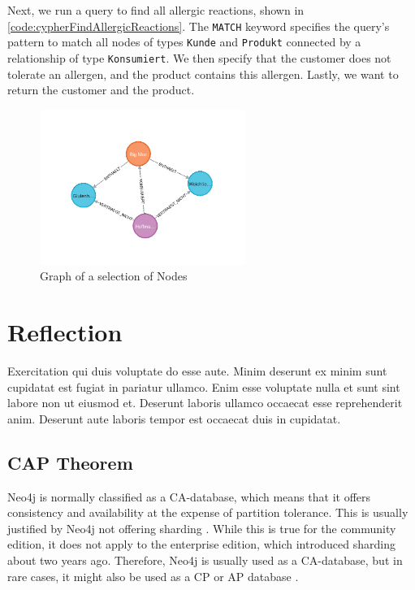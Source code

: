 Next, we run a query to find all allergic reactions, shown in \autoref{code:cypherFindAllergicReactions}. The \texttt{MATCH} keyword specifies the query's pattern to match all nodes of types \texttt{Kunde} and \texttt{Produkt} connected by a relationship of type \texttt{Konsumiert}. We then specify that the customer does not tolerate an allergen, and the product contains this allergen. Lastly, we want to return the customer and the product.

\begin{figure}[H]
    \centering
    \caption{Graph of a selection of Nodes} \label{fig:neo4jGraph_2}
    \includegraphics[width=0.6\textwidth]{images/neo4j_example_graph_2.png}
\end{figure}

\section{Reflection} \label{sec:reflectionNeo4j}

Exercitation qui duis voluptate do esse aute. Minim deserunt ex minim sunt cupidatat est fugiat in pariatur ullamco. Enim esse voluptate nulla et sunt sint labore non ut eiusmod et. Deserunt laboris ullamco occaecat esse reprehenderit anim. Deserunt aute laboris tempor est occaecat duis in cupidatat.

\subsection{CAP Theorem} \label{subsec:capTheoremNeo4j}

Neo4j is normally classified as a \ac{CA}-database, which means that it offers consistency and availability at the expense of partition tolerance. This is usually justified by Neo4j not offering sharding \parencite{cap_neo4j}. While this is true for the community edition, it does not apply to the enterprise edition, which introduced sharding about two years ago. Therefore, Neo4j is usually used as a \ac{CA}-database, but in rare cases, it might also be used as a \ac{CP} or \ac{AP} database \parencite{consistency_models_cap_neo4j}.

